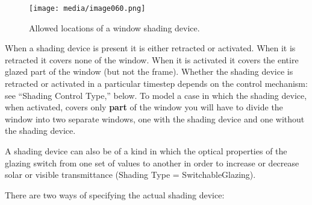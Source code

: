 \begin{figure}[hbtp] %
\centering
\texttt{[image: media/image060.png]}
\caption{Allowed locations of a window shading device. \protect \label{fig:allowed-locations-of-a-window-shading-device.}}
\end{figure}

When a shading device is present it is either retracted or activated. When it is retracted it covers none of the window. When it is activated it covers the entire glazed part of the window (but not the frame). Whether the shading device is retracted or activated in a particular timestep depends on the control mechanism: see ``Shading Control Type,'' below. To model a case in which the shading device, when activated, covers only \textbf{part} of the window you will have to divide the window into two separate windows, one with the shading device and one without the shading device.

A shading device can also be of a kind in which the optical properties of the glazing switch from one set of values to another in order to increase or decrease solar or visible transmittance (Shading Type = SwitchableGlazing).

There are two ways of specifying the actual shading device:

